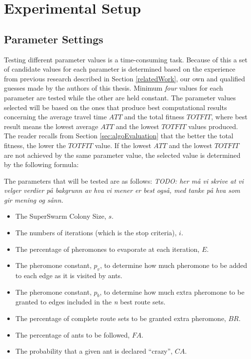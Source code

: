 \section{Experimental Setup}

 
\subsection{Parameter Settings}
\label{subsec:parameterSettings_setup}

Testing different parameter values is a time-consuming task. Because of this a set of candidate values for each parameter is determined based on the experience from previous research described in Section \vref{relatedWork}, our own  and qualified guesses made by the authors of this thesis. Minimum \textit{four} values for each parameter are tested while the other are held constant. The parameter values selected will be based on the ones that produce best computational results concerning the average travel time $ATT$ and the total fitness $TOTFIT$, where best result means the lowest average $ATT$ and the lowest $TOTFIT$ values produced. The reader recalls from Section \vref{sec:algoEvaluation} that the better the total fitness, the lower the $TOTFIT$ value. If the lowest $ATT$ and the lowest $TOTFIT$ are not achieved by the same parameter value, the selected value is determined by the following formula:

The parameters that will be tested are as follows:
\emph{\color{blue} TODO: her må vi skrive at vi velger verdier på bakgrunn av hva vi mener er best også, med tanke på hva som gir mening og sånn. }  

\begin{itemize}
\item The SuperSwarm Colony Size, $s$. 
\item The numbers of iterations (which is the stop criteria), $i$.
\item The percentage of pheromones to evaporate at each iteration, $E$.
\item The pheromone constant, $p_v$, to determine how much pheromone to be added to each edge as it is visited by ants.
\item The pheromone constant, $p_b$, to determine how much extra pheromone to be granted to edges included in the \textit{n} best route sets.
\item The percentage of complete route sets to be granted extra pheromone, $BR$.
\item The percentage of ants to be followed, $FA$.
\item The probability that a given ant is declared ``crazy'', $CA$.
\end{itemize}

